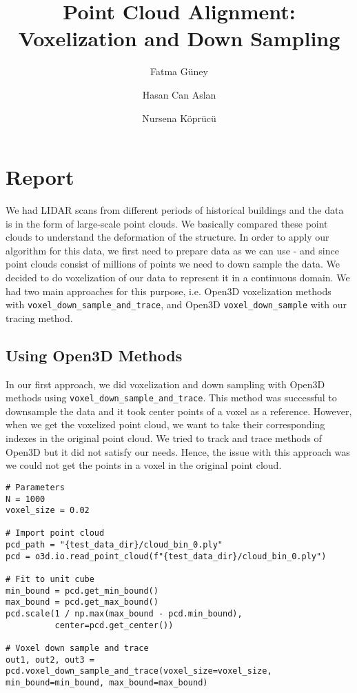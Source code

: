 \documentclass[a4paper]{article}
\author{Fatma Güney}
\author{Hasan Can Aslan}
\author{Nursena Köprücü}
\affil{Department of Computer Engineering, Koç University}
\title{Point Cloud Alignment: Voxelization and Down Sampling}
\date{\projectDate}
\begin{document}
\lstset{language=Python}
\pagestyle{fancy}
\fancyhf{}
\chead{\projectTitle}
\lfoot{\nouppercase{\leftmark}}
\thispagestyle{fancy}
\renewcommand{\headrulewidth}{0.4pt}
\renewcommand{\footrulewidth}{0.4pt}

\maketitle
\thispagestyle{empty}

\section{Report}

We had LIDAR scans from different periods of historical buildings and the data is in the form of large-scale point clouds. We basically compared these point clouds to understand the deformation of the structure. In order to apply our algorithm for this data, we first need to prepare data as we can use - and since point clouds consist of millions of points we need to down sample the data. We decided to do voxelization of our data to represent it in a continuous domain. We had two main approaches for this purpose, i.e. Open3D voxelization methods with \texttt{voxel\_down\_sample\_and\_trace}, and Open3D  \texttt{voxel\_down\_sample} with our tracing method.

\subsection{Using Open3D Methods}
In our first approach, we did voxelization and down sampling with Open3D methods using \texttt{voxel\_down\_sample\_and\_trace}. This method was successful to downsample the data and it took center points of a voxel as a reference. However, when we get the voxelized point cloud, we want to take their corresponding indexes in the original point cloud. We tried to track and trace methods of Open3D but it did not satisfy our needs. Hence, the issue with this approach was we could not get the points in a voxel in the original point cloud. 

\begin{lstlisting}[caption={Voxel down sampling with our test data using \texttt{voxel\_down\_sample\_and\_trace}.}]
# Parameters
N = 1000
voxel_size = 0.02

# Import point cloud
pcd_path = "{test_data_dir}/cloud_bin_0.ply"
pcd = o3d.io.read_point_cloud(f"{test_data_dir}/cloud_bin_0.ply")

# Fit to unit cube
min_bound = pcd.get_min_bound()
max_bound = pcd.get_max_bound()
pcd.scale(1 / np.max(max_bound - pcd.min_bound),
          center=pcd.get_center())

# Voxel down sample and trace
out1, out2, out3 = pcd.voxel_down_sample_and_trace(voxel_size=voxel_size, min_bound=min_bound, max_bound=max_bound)
\end{lstlisting}
\end{document}
